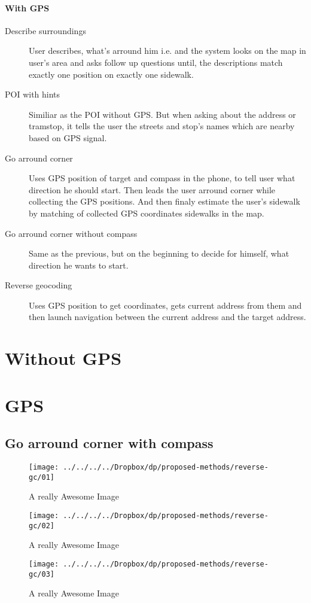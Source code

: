 		\paragraph{With GPS}
		\begin{description}
			\item [Describe surroundings]
			User describes, what's arround him i.e.  and the system looks on the map in user's area and asks follow up questions until, the descriptions match exactly one position on exactly one sidewalk.								
			\item [POI with hints]
			Similiar as the POI without GPS. But when asking about the address or tramstop, it tells the user the streets and stop's names which are nearby based on GPS signal.
			\item [Go arround corner]
			Uses GPS position of target and compass in the phone, to tell user what direction he should start. Then leads the user arround corner while collecting the GPS positions. And then finaly estimate the user's sidewalk by matching of collected GPS coordinates sidewalks in the map.
			\item [Go arround corner without compass]
			Same as the previous, but on the beginning to decide for himself, what direction he wants to start.
			\item [Reverse geocoding]
			Uses GPS position to get coordinates, gets current address from them and then launch navigation between the current address and the target address.
		\end{description}
		
		
		
		\section{Without GPS}
		\section{GPS}
		\subsection{Go arround corner with compass}
		\begin{figure}[!htb]
			\texttt{[image: ../../../../Dropbox/dp/proposed-methods/reverse-gc/01]}
			\caption{A really Awesome Image}\label{fig:awesome_image1}
			\endminipage\hfill
			\texttt{[image: ../../../../Dropbox/dp/proposed-methods/reverse-gc/02]}
			\caption{A really Awesome Image}\label{fig:awesome_image2}
			\endminipage\hfill
			\texttt{[image: ../../../../Dropbox/dp/proposed-methods/reverse-gc/03]}
			\caption{A really Awesome Image}\label{fig:awesome_image3}
			\endminipage
		\end{figure}
		
